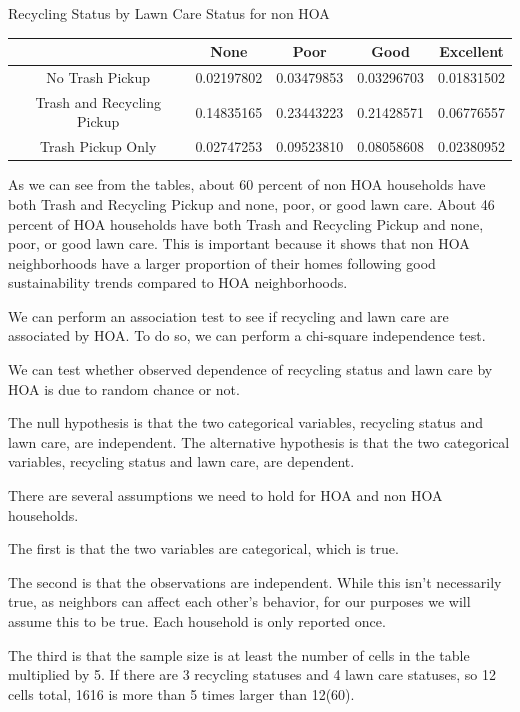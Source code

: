 \documentclass{article}
\begin{document}
\begin{center} Recycling Status by Lawn Care Status for non HOA \end{center}
\begin{table}[H]
\begin{tabular}{|c|c|c|c|c|} \hline
                           & None       & Poor       & Good       & Excellent  \\ \hline
No Trash Pickup            & 0.02197802 & 0.03479853 & 0.03296703 & 0.01831502 \\ \hline
Trash and Recycling Pickup & 0.14835165 & 0.23443223 & 0.21428571 & 0.06776557 \\ \hline
Trash Pickup Only          & 0.02747253 & 0.09523810 & 0.08058608 & 0.02380952 \\ \hline
\end{tabular}
\end{table}

As we can see from the tables, about 60 percent of non HOA households have both Trash and Recycling Pickup and none, poor, or good lawn care. About 46 percent of HOA households have both Trash and Recycling Pickup and none, poor, or good lawn care. This is important because it shows that non HOA neighborhoods have a larger proportion of their homes following good sustainability trends compared to HOA neighborhoods. 

We can perform an association test to see if recycling and lawn care are associated by HOA. To do so, we can perform a chi-square independence test.

We can test whether observed dependence of recycling status and lawn care by HOA is due to random chance or not. 

The null hypothesis is that the two categorical variables, recycling status and lawn care, are independent.
The alternative hypothesis is that the two categorical variables, recycling status and lawn care, are dependent. 

There are several assumptions we need to hold for HOA and non HOA households. 

The first is that the two variables are categorical, which is true.

The second is that the observations are independent. While this isn't necessarily true, as neighbors can affect each other's behavior, for our purposes we will assume this to be true. Each household is only reported once. 

The third is that the sample size is at least the number of cells in the table multiplied by 5. If there are 3 recycling statuses and 4 lawn care statuses, so 12 cells total, 1616 is more than 5 times larger than 12(60). 
\end{document}

